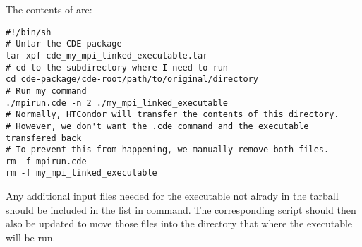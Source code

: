 The contents of  are:
\begin{verbatim}
#!/bin/sh
# Untar the CDE package
tar xpf cde_my_mpi_linked_executable.tar
# cd to the subdirectory where I need to run
cd cde-package/cde-root/path/to/original/directory
# Run my command
./mpirun.cde -n 2 ./my_mpi_linked_executable
# Normally, HTCondor will transfer the contents of this directory.
# However, we don't want the .cde command and the executable transfered back
# To prevent this from happening, we manually remove both files.
rm -f mpirun.cde
rm -f my_mpi_linked_executable
\end{verbatim}

Any additional input files needed for the executable not alrady in the tarball
should be included in the list in  command. 
The corresponding script should then also be updated to move those files into
the directory that where the executable will be run.


